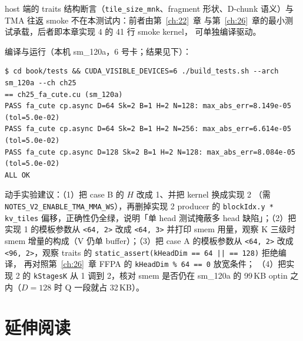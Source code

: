 host 端的 traits 结构断言（\texttt{tile\_\allowbreak{}size\_\allowbreak{}mnk}、fragment
形状、D-chunk 语义）与 TMA 往返 smoke 不在本测试内：前者由第~\ref{ch:22}~章
与第~\ref{ch:26}~章的最小测试承载，后者即本章实现 4 的 41 行 smoke kernel，
可单独编译驱动。

编译与运行（本机 sm\_120a，6 号卡；结果见下）：

{\footnotesize
\begin{lstlisting}[style=console]
$ cd book/tests && CUDA_VISIBLE_DEVICES=6 ./build_tests.sh --arch sm_120a --ch ch25
== ch25_fa_cute.cu (sm_120a)
PASS fa_cute cp.async D=64 Sk=2 B=1 H=2 N=128: max_abs_err=8.149e-05 (tol=5.0e-02)
PASS fa_cute cp.async D=64 Sk=2 B=1 H=2 N=256: max_abs_err=6.614e-05 (tol=5.0e-02)
PASS fa_cute cp.async D=128 Sk=2 B=1 H=2 N=128: max_abs_err=8.084e-05 (tol=5.0e-02)
ALL OK
\end{lstlisting}
}

动手实验建议：（1）把 case B 的 $H$ 改成 1、并把 kernel 换成实现 2
（需 \texttt{NOTES\_\allowbreak{}V2\_\allowbreak{}ENABLE\_\allowbreak{}TMA\_\allowbreak{}MMA\_\allowbreak{}WS}），再删掉实现 2 producer 的
\texttt{blockIdx.y * kv\_tiles} 偏移，正确性仍全绿，说明「单 head
测试掩蔽多 head 缺陷」；（2）把实现 1 的模板参数从
\texttt{<64, 2>} 改成 \texttt{<64, 3>} 并打印 smem 用量，观察 K 三级时
smem 增量的构成（V 仍单 buffer）；（3）把 case A 的模板参数从
\texttt{<64, 2>} 改成 \texttt{<96, 2>}，观察 traits 的
\texttt{static\_\allowbreak{}assert\allowbreak{}(k\allowbreak{}Head\allowbreak{}Dim =\allowbreak{}=\allowbreak{} 64 || =\allowbreak{}=\allowbreak{} 128)} 拒绝编译，
再对照第~\ref{ch:26}~章 FFPA 的 \texttt{kHeadDim \% 64 == 0} 放宽条件；
（4）把实现 2 的 \texttt{kStagesK} 从 1 调到 2，核对 smem 是否仍在
sm\_120a 的 99\,KB optin 之内（$D{=}128$ 时 Q 一段就占 32\,KB）。



\section*{延伸阅读}

